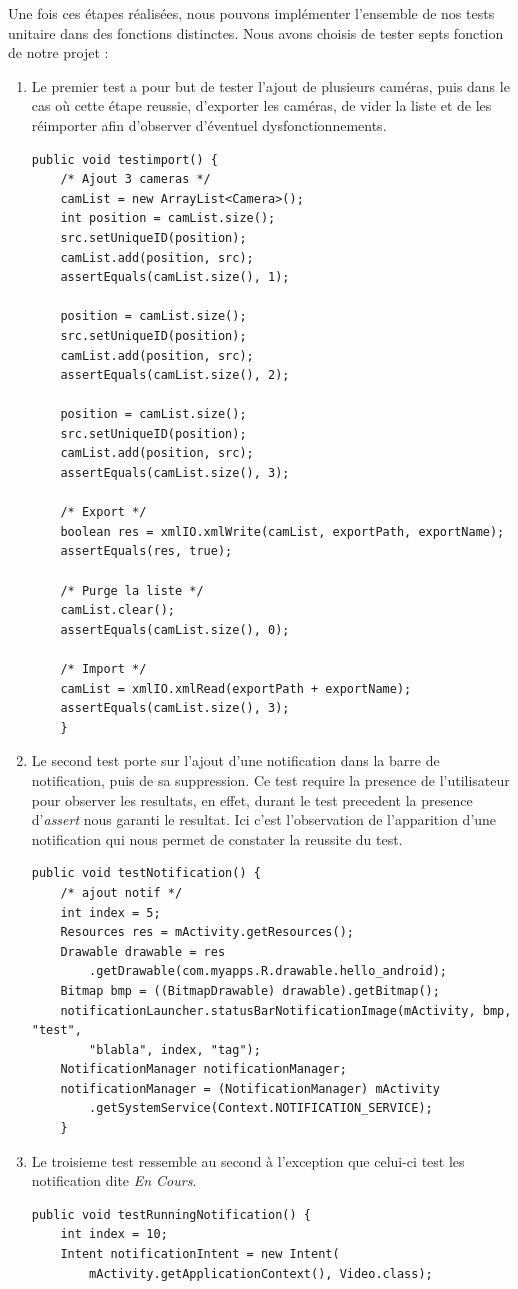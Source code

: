 Une fois ces étapes réalisées, nous pouvons implémenter l'ensemble de nos tests unitaire dans des fonctions distinctes. Nous avons choisis de tester septs fonction de notre projet :
\begin{enumerate}
\item Le premier test a pour but de tester l'ajout de plusieurs caméras, puis dans le cas où cette étape reussie, d'exporter les caméras, de vider la liste et de les réimporter afin d'observer d'éventuel dysfonctionnements.
\begin{lstlisting}[format=JAVA,caption={Test 1 : Import/Export}]
  public void testimport() {
	/* Ajout 3 cameras */
	camList = new ArrayList<Camera>();
	int position = camList.size();
	src.setUniqueID(position);
	camList.add(position, src);
	assertEquals(camList.size(), 1);

	position = camList.size();
	src.setUniqueID(position);
	camList.add(position, src);
	assertEquals(camList.size(), 2);

	position = camList.size();
	src.setUniqueID(position);
	camList.add(position, src);
	assertEquals(camList.size(), 3);

	/* Export */
	boolean res = xmlIO.xmlWrite(camList, exportPath, exportName);
	assertEquals(res, true);

	/* Purge la liste */
	camList.clear();
	assertEquals(camList.size(), 0);

	/* Import */
	camList = xmlIO.xmlRead(exportPath + exportName);
	assertEquals(camList.size(), 3);
    }
\end{lstlisting}
\item Le second test porte sur l'ajout d'une notification dans la barre de notification, puis de sa suppression. Ce test require la presence de l'utilisateur pour observer les resultats, en effet, durant le test precedent la presence d'\textit{assert} nous garanti le resultat. Ici c'est l'observation de l'apparition d'une notification qui nous permet de constater la reussite du test.
\begin{lstlisting}[format=JAVA,caption={Test 2 : Notification}]
    public void testNotification() {
	/* ajout notif */
	int index = 5;
	Resources res = mActivity.getResources();
	Drawable drawable = res
		.getDrawable(com.myapps.R.drawable.hello_android);
	Bitmap bmp = ((BitmapDrawable) drawable).getBitmap();
	notificationLauncher.statusBarNotificationImage(mActivity, bmp, "test",
		"blabla", index, "tag");
	NotificationManager notificationManager;
	notificationManager = (NotificationManager) mActivity
		.getSystemService(Context.NOTIFICATION_SERVICE);
    }
\end{lstlisting}
\item Le troisieme test ressemble au second à l'exception que celui-ci test les notification dite \textit{En Cours}.
\begin{lstlisting}[format=JAVA,caption={Test 3 : Notification En-Cours}]
  public void testRunningNotification() {
	int index = 10;
	Intent notificationIntent = new Intent(
		mActivity.getApplicationContext(), Video.class);


\end{lstlisting}
\end{enumerate}
